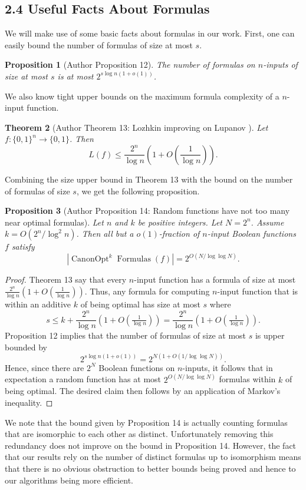 \documentclass[10pt,a4paper]{article}
\newtheorem{nttheorem}{Theorem}
\newtheorem{ntproposition}[nttheorem]{Proposition}
\newcommand{\Canon}[1]{\operatorname{CanonOpt}^{#1}\!\operatorname{Formulas}}
\begin{document}
\subsection*{2.4 Useful Facts About Formulas}
We will make use of some basic facts about formulas in our work. First, one can easily bound the number of formulas of size at most $s$.
\begin{ntproposition}[Author Proposition 12]
The number of formulas on $n$-inputs of size at most $s$ is at most $2^{s\log n(1+o(1))}$.
\end{ntproposition}
We also know tight upper bounds on the maximum formula complexity of a $n$-input function.
\begin{nttheorem}[Author Theorem 13: Lozhkin {\cite{ref11}} improving on Lupanov {\cite{ref12}}]
Let $f:\{0,1\}^n\to\{0,1\}$. Then
\[L(f)\leq\frac{2^n}{\log n}\left(1+O\left(\frac 1{\log n}\right)\right).\]
\end{nttheorem}
Combining the size upper bound in Theorem 13 with the bound on the number of formulas of size $s$, we get the following proposition.
\begin{ntproposition}[Author Proposition 14: Random functions have not too many near optimal formulas]
Let $n$ and $k$ be positive integers. Let $N=2^n$. Assume $k=O(2^n/\log^2n)$. Then all but a $o(1)$-fraction of $n$-input Boolean functions $f$ satisfy
\[|\Canon{k}(f)|=2^{O(N/\log\log N)}.\]
\end{ntproposition}
\begin{proof}
Theorem 13 say that every $n$-input function has a formula of size at most $\frac{2^n}{\log n}(1+O(\frac 1{\log n}))$. Thus, any formula for computing $n$-input function that is within an additive $k$ of being optimal has size at most $s$ where
\[s\leq k+\frac{2^n}{\log n}(1+O(\tfrac 1{\log n}))=\frac{2^n}{\log n}(1+O(\tfrac 1{\log n})).\]
Proposition 12 implies that the number of formulas of size at most $s$ is upper bounded by
\[2^{s\log n(1+o(1))}=2^{N(1+O(1/\log\log N))}.\]
Hence, since there are $2^N$ Boolean functions on $n$-inputs, it follows that in expectation a random function has at most $2^{O(N/\log\log N)}$ formulas within $k$ of being optimal. The desired claim then follows by an application of Markov's inequality.
\end{proof}
We note that the bound given by Proposition 14 is actually counting formulas that are isomorphic to each other as distinct. Unfortunately removing this redundancy does not improve on the bound in Proposition 14. However, the fact that our results rely on the number of distinct formulas up to isomorphism means that there is no obvious obstruction to better bounds being proved and hence to our algorithms being more efficient.
\end{document}
